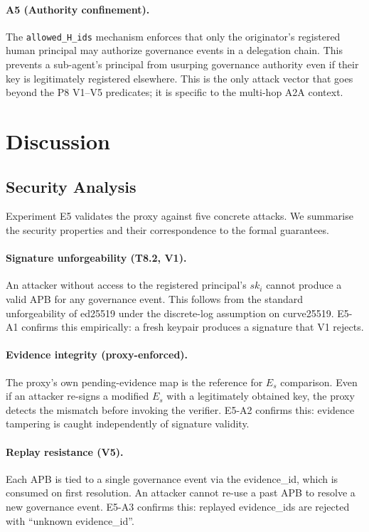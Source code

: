\documentclass[11pt]{article}
\newcommand{\Es}{E_s}
\begin{document}
\paragraph{A5 (Authority confinement).}
The \texttt{allowed\_H\_ids} mechanism enforces that only
the originator's registered human principal may authorize governance
events in a delegation chain.
This prevents a sub-agent's principal from usurping governance authority
even if their key is legitimately registered elsewhere.
This is the only attack vector that goes beyond the P8 V1--V5 predicates;
it is specific to the multi-hop A2A context.

\section{Discussion}
\label{sec:discussion}

\subsection{Security Analysis}
\label{sec:security}

Experiment E5 validates the proxy against five concrete attacks.
We summarise the security properties and their correspondence to the
formal guarantees.

\paragraph{Signature unforgeability (T8.2, V1).}
An attacker without access to the registered principal's $sk_i$ cannot
produce a valid APB for any governance event.
This follows from the standard unforgeability of ed25519 under the
discrete-log assumption on curve25519.
E5-A1 confirms this empirically: a fresh keypair produces a signature
that V1 rejects.

\paragraph{Evidence integrity (proxy-enforced).}
The proxy's own pending-evidence map is the reference for $\Es$ comparison.
Even if an attacker re-signs a modified $\Es$ with a legitimately obtained
key, the proxy detects the mismatch before invoking the verifier.
E5-A2 confirms this: evidence tampering is caught independently of
signature validity.

\paragraph{Replay resistance (V5).}
Each APB is tied to a single governance event via the evidence\_id,
which is consumed on first resolution.
An attacker cannot re-use a past APB to resolve a new governance event.
E5-A3 confirms this: replayed evidence\_ids are rejected with
``unknown evidence\_id''.
\end{document}
